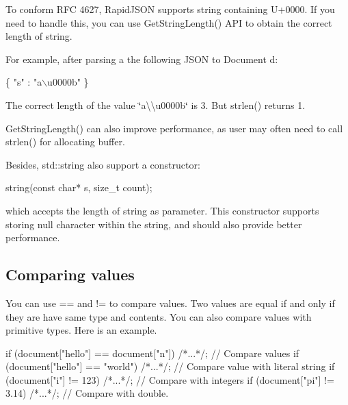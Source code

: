 To conform R\+FC 4627, Rapid\+J\+S\+ON supports string containing {\ttfamily U+0000}. If you need to handle this, you can use {\ttfamily Get\+String\+Length()} A\+PI to obtain the correct length of string.

For example, after parsing a the following J\+S\+ON to {\ttfamily Document d}\+:


\begin{DoxyCode}
\{ \textcolor{stringliteral}{"s"} :  \textcolor{stringliteral}{"a\(\backslash\)u0000b"} \}
\end{DoxyCode}
 The correct length of the value {\ttfamily \char`\"{}a\textbackslash{}\textbackslash{}u0000b\char`\"{}} is 3. But {\ttfamily strlen()} returns 1.

{\ttfamily Get\+String\+Length()} can also improve performance, as user may often need to call {\ttfamily strlen()} for allocating buffer.

Besides, {\ttfamily std\+::string} also support a constructor\+:


\begin{DoxyCode}
string(\textcolor{keyword}{const} \textcolor{keywordtype}{char}* s, \textcolor{keywordtype}{size\_t} count);
\end{DoxyCode}


which accepts the length of string as parameter. This constructor supports storing null character within the string, and should also provide better performance.

\subsection*{Comparing values}

You can use {\ttfamily ==} and {\ttfamily !=} to compare values. Two values are equal if and only if they are have same type and contents. You can also compare values with primitive types. Here is an example.


\begin{DoxyCode}
\textcolor{keywordflow}{if} (document[\textcolor{stringliteral}{"hello"}] == document[\textcolor{stringliteral}{"n"}]) \textcolor{comment}{/*...*/};    \textcolor{comment}{// Compare values}
\textcolor{keywordflow}{if} (document[\textcolor{stringliteral}{"hello"}] == \textcolor{stringliteral}{"world"}) \textcolor{comment}{/*...*/};          \textcolor{comment}{// Compare value with literal string}
\textcolor{keywordflow}{if} (document[\textcolor{stringliteral}{"i"}] != 123) \textcolor{comment}{/*...*/};                  \textcolor{comment}{// Compare with integers}
\textcolor{keywordflow}{if} (document[\textcolor{stringliteral}{"pi"}] != 3.14) \textcolor{comment}{/*...*/};                \textcolor{comment}{// Compare with double.}
\end{DoxyCode}


